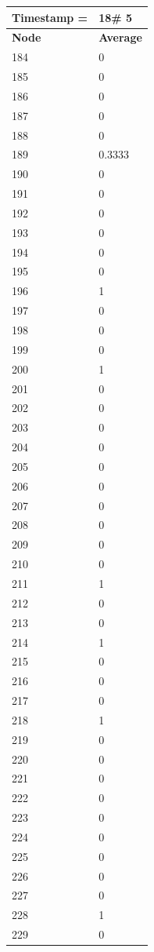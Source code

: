 \begin{tabular}{|l||l|}
\hline
\textbf{Timestamp =} & \textbf{18}\# 5\\\hline
	\textbf{Node} & \textbf{Average} \\ \hline
\hline
	184 & 0 \\ \hline
	185 & 0 \\ \hline
	186 & 0 \\ \hline
	187 & 0 \\ \hline
	188 & 0 \\ \hline
	189 & 0.3333 \\ \hline
	190 & 0 \\ \hline
	191 & 0 \\ \hline
	192 & 0 \\ \hline
	193 & 0 \\ \hline
	194 & 0 \\ \hline
	195 & 0 \\ \hline
	196 & 1 \\ \hline
	197 & 0 \\ \hline
	198 & 0 \\ \hline
	199 & 0 \\ \hline
	200 & 1 \\ \hline
	201 & 0 \\ \hline
	202 & 0 \\ \hline
	203 & 0 \\ \hline
	204 & 0 \\ \hline
	205 & 0 \\ \hline
	206 & 0 \\ \hline
	207 & 0 \\ \hline
	208 & 0 \\ \hline
	209 & 0 \\ \hline
	210 & 0 \\ \hline
	211 & 1 \\ \hline
	212 & 0 \\ \hline
	213 & 0 \\ \hline
	214 & 1 \\ \hline
	215 & 0 \\ \hline
	216 & 0 \\ \hline
	217 & 0 \\ \hline
	218 & 1 \\ \hline
	219 & 0 \\ \hline
	220 & 0 \\ \hline
	221 & 0 \\ \hline
	222 & 0 \\ \hline
	223 & 0 \\ \hline
	224 & 0 \\ \hline
	225 & 0 \\ \hline
	226 & 0 \\ \hline
	227 & 0 \\ \hline
	228 & 1 \\ \hline
	229 & 0 \\ \hline
\end{tabular}
